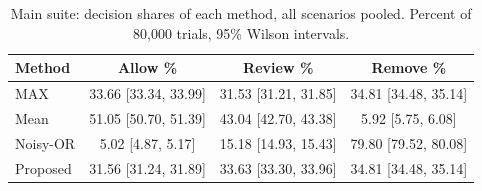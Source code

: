 \begin{table}[!t]
\caption{Main suite: decision shares of each method, all scenarios pooled. Percent of 80,000 trials, 95\% Wilson intervals.}
\label{tab:mc-main-overall}
\centering\footnotesize
\begin{tabular}{@{}lccc@{}}
\toprule
\textbf{Method} & \textbf{Allow \%} & \textbf{Review \%} & \textbf{Remove \%} \\
\midrule
MAX & 33.66 [33.34, 33.99] & 31.53 [31.21, 31.85] & 34.81 [34.48, 35.14] \\
Mean & 51.05 [50.70, 51.39] & 43.04 [42.70, 43.38] & 5.92 [5.75, 6.08] \\
Noisy-OR & 5.02 [4.87, 5.17] & 15.18 [14.93, 15.43] & 79.80 [79.52, 80.08] \\
Proposed & 31.56 [31.24, 31.89] & 33.63 [33.30, 33.96] & 34.81 [34.48, 35.14] \\
\bottomrule
\end{tabular}
\end{table}
